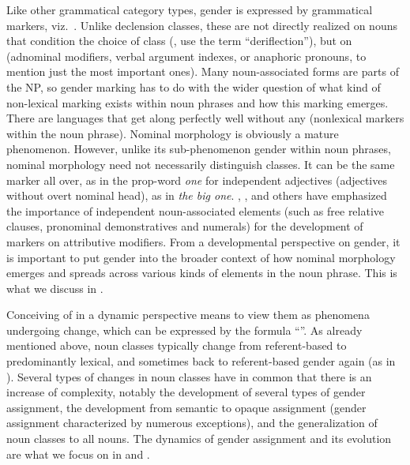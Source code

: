 \documentclass[output=collectionpaper]{langsci/langscibook}
\begin{document}
Like other grammatical category types, gender is expressed by grammatical markers, viz.\ . Unlike declension classes, these are not directly realized on nouns that condition the choice of class (, use the term ``deriflection''), but on  (adnominal modifiers, verbal argument indexes, or anaphoric pronouns, to mention just the most important ones). Many noun-associated forms are parts of the NP, so gender marking has to do with the wider question of what kind of non-lexical marking exists within noun phrases and how this marking emerges. There are languages that get along perfectly well without any  (nonlexical markers within the noun phrase). Nominal morphology is obviously a mature phenomenon. However, unlike its sub-phenomenon gender within noun phrases, nominal morphology need not necessarily distinguish classes. It can be the same marker all over, as in the  prop-word \textit{one} for independent adjectives (adjectives without overt nominal head), as in \textit{the big one}. \cite{Lehmann1982}, \cite{Moravcsik1994}, and others have emphasized the importance of independent noun-associated elements (such as free relative clauses, pronominal demonstratives and numerals) for the development of markers on attributive modifiers. From a developmental perspective on gender, it is important to put gender into the broader context of how nominal morphology emerges and spreads across various kinds of elements in the noun phrase. This is what we discuss in .

Conceiving of  in a dynamic perspective means to view them as phenomena undergoing change, which can be expressed by the formula ``''. As already mentioned above, noun classes typically change from referent-based to predominantly lexical, and sometimes back to referent-based gender again (as in ). Several types of changes in noun classes have in common that there is an increase of complexity, notably the development of several types of gender assignment, the development from semantic to opaque assignment (gender assignment characterized by numerous exceptions), and the generalization of noun classes to all nouns. The dynamics of gender assignment and its evolution are what we focus on in  and .
\end{document}

